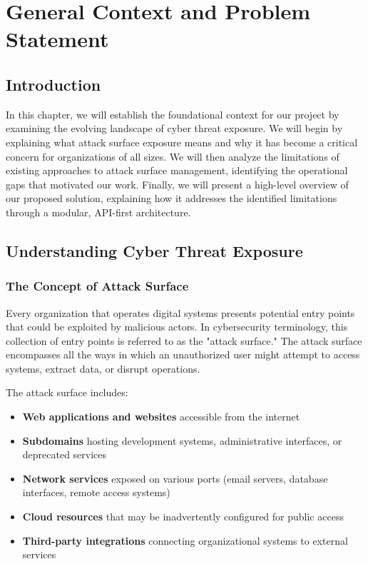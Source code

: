 \documentclass[a4paper,12pt]{report}
\begin{document}
\chapter{General Context and Problem Statement}
\thispagestyle{plain}
\section*{Introduction}
In this chapter, we will establish the foundational context for our project by examining the evolving landscape of cyber threat exposure. We will begin by explaining what attack surface exposure means and why it has become a critical concern for organizations of all sizes. We will then analyze the limitations of existing approaches to attack surface management, identifying the operational gaps that motivated our work. Finally, we will present a high-level overview of our proposed solution, explaining how it addresses the identified limitations through a modular, API-first architecture.

\section{Understanding Cyber Threat Exposure}

\subsection{The Concept of Attack Surface}

Every organization that operates digital systems presents potential entry points that could be exploited by malicious actors. In cybersecurity terminology, this collection of entry points is referred to as the "attack surface."\cite{attack_surface_def} The attack surface encompasses all the ways in which an unauthorized user might attempt to access systems, extract data, or disrupt operations.\hfill \break

The attack surface includes:

\begin{itemize}
\item \textbf{Web applications and websites} accessible from the internet
\item \textbf{Subdomains} hosting development systems, administrative interfaces, or deprecated services
\item \textbf{Network services} exposed on various ports (email servers, database interfaces, remote access systems)
\item \textbf{Cloud resources} that may be inadvertently configured for public access
\item \textbf{Third-party integrations} connecting organizational systems to external services
\end{itemize}
\end{document}
